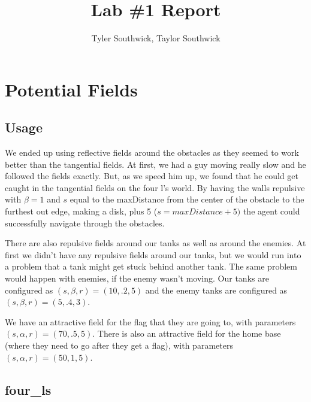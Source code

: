 \documentclass[11pt]{article}
\begin{document}
\title{Lab \#1 Report}

\author{Tyler Southwick, Taylor Southwick}

\date{}

\maketitle

\section{Potential Fields}
\subsection{Usage}

We ended up using reflective fields around the obstacles as they seemed to work better than the tangential fields.
At first, we had a guy moving really slow and he followed the fields exactly.
But, as we speed him up, we found that he could get caught in the tangential fields on the four l's world.
By having the walls repulsive with $\beta = 1$ and $s$ equal to the maxDistance from the center of the obstacle to the furthest out edge, making a disk, plus 5 ($s=maxDistance + 5)$ the agent could successfully navigate through the obstacles.

There are also repulsive fields around our tanks as well as around the enemies.
At first we didn't have any repulsive fields around our tanks, but we would run into a problem that a tank might get stuck behind another tank.
The same problem would happen with enemies, if the enemy wasn't moving.
Our tanks are configured as $(s, \beta, r) = (10, .2, 5)$ and the enemy tanks are configured as $(s, \beta, r) = (5, .4, 3)$.

We have an attractive field for the flag that they are going to, with parameters $(s, \alpha, r) = (70, .5, 5)$. 
There is also an attractive field for the home base (where they need to go after they get a flag), with parameters $(s, \alpha, r) = (50, 1, 5)$. 

\subsection{four\_ls}
\end{document}
